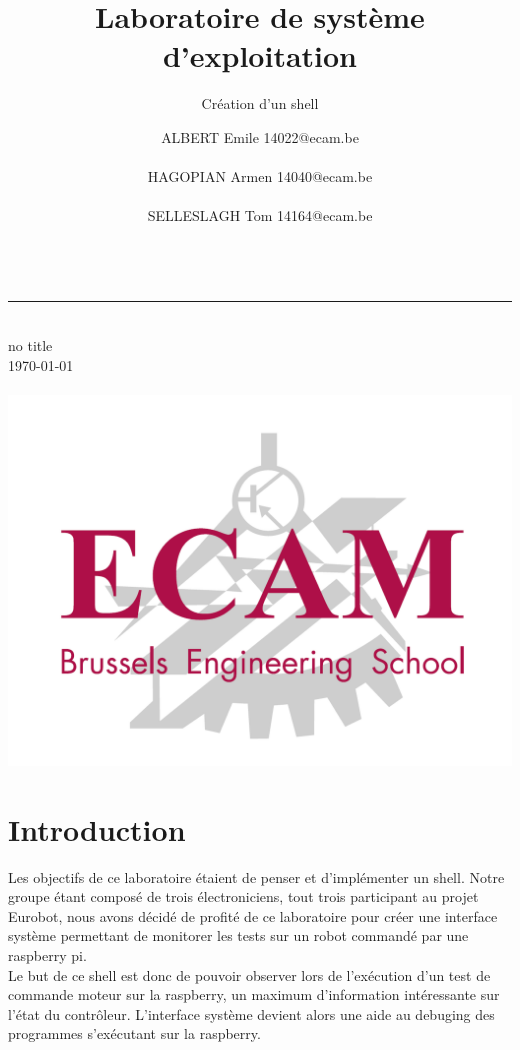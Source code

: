 \documentclass[10pt,a4paper]{article}
\title{Laboratoire de système d'exploitation}
\subtitle{Création d'un shell}
\author{
ALBERT Emile 14022@ecam.be\\\\
HAGOPIAN Armen 14040@ecam.be\\\\
SELLESLAGH Tom 14164@ecam.be\\\\
}
\makeatletter
\def\@subtitle{no title}
\makeatother
\begin{document}
\begin{titlepage} 
	\hspace{0.5cm}	
	\rule{1.5pt}{\textheight} 
	\hspace{1.5cm}		
	\parbox[b]{13cm}
	{  		
		{\huge \thetitle}\\[1\baselineskip]
		{\LARGE \@subtitle} \\[1\baselineskip]
		\today \\[3\baselineskip]
		
		{\Large \theauthor}\\[22\baselineskip]
		\hspace*{6cm}\includegraphics[scale=0.3]{Logo_ECAM.png}
	}
\end{titlepage}

\section{Introduction}
Les objectifs de ce laboratoire étaient de penser et d'implémenter un shell. Notre groupe étant composé de trois électroniciens, tout trois participant au projet Eurobot, nous avons décidé de profité de ce laboratoire pour créer une interface système permettant de monitorer les tests sur un robot commandé par une raspberry pi.\\
  
Le but de ce shell est donc de pouvoir observer lors de l'exécution d'un test de commande moteur sur la raspberry, un maximum d'information intéressante sur l'état du contrôleur. L'interface système devient alors une aide au debuging des programmes s'exécutant sur la raspberry.
\end{document}
